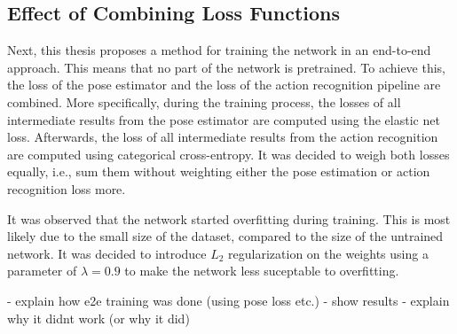 \subsection{Effect of Combining Loss Functions}
Next, this thesis proposes a method for training the network in an end-to-end approach.
This means that no part of the network is pretrained.
To achieve this, the loss of the pose estimator and the loss of the action recognition pipeline are combined.
More specifically, during the training process, the losses of all intermediate results from the pose estimator are computed using the elastic net loss.
Afterwards, the loss of all intermediate results from the action recognition are computed using categorical cross-entropy.
It was decided to weigh both losses equally, i.e., sum them without weighting either the pose estimation or action recognition loss more.

It was observed that the network started overfitting during training.
This is most likely due to the small size of the dataset, compared to the size of the untrained network.
It was decided to introduce $L_2$ regularization on the weights using a parameter of $\lambda = 0.9$ to make the network less suceptable to overfitting.

- explain how e2e training was done (using pose loss etc.)
- show results
- explain why it didnt work (or why it did)


